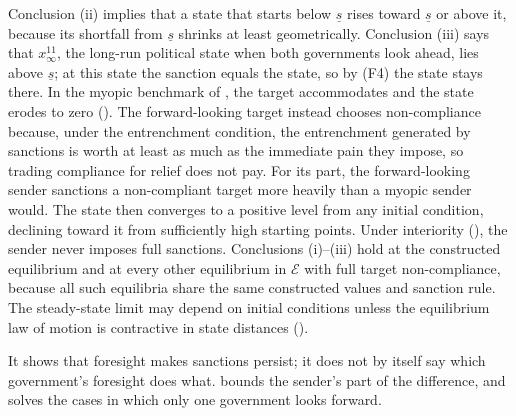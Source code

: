  Conclusion (ii)
implies that a state that starts below $\underline s$ rises toward $\underline s$ or above
it, because its shortfall from $\underline s$ shrinks at least geometrically. Conclusion
(iii) says that $x^{11}_\infty$, the long-run political state when both governments look
ahead, lies above $\underline s$; at this state the sanction equals the state, so by
\textup{(F4)} the state stays there. In the myopic
benchmark of , the target accommodates and the state
erodes to zero (). The forward-looking target instead chooses
non-compliance because, under the entrenchment condition, the entrenchment generated
by sanctions is worth at least as much as the immediate pain they impose, so trading
compliance for relief does not pay. For its part, the forward-looking sender
sanctions a non-compliant target more heavily than a myopic sender would. The state
then converges to a positive level from any initial condition, declining toward it
from sufficiently high starting points. Under interiority (), the
sender never imposes full sanctions. Conclusions (i)--(iii) hold at the constructed equilibrium and at every other
equilibrium in $\mathcal E$ with full target non-compliance, because all such equilibria share the same constructed values and
sanction rule. The steady-state limit may depend on initial conditions unless the
equilibrium law of motion is contractive in state distances
().

 It shows that foresight makes sanctions persist; it does not by
itself say which government's foresight does what.  bounds
the sender's part of the difference, and
 solves the cases in which only one government looks
forward.

